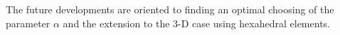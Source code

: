 \documentclass[preprint,12pt,authoryear]{elsarticle}
\begin{document}
The future developments are oriented to finding an optimal choosing of the parameter $\alpha$ and the extension to the 3-D case using hexahedral elements.   
 





\end{document}
